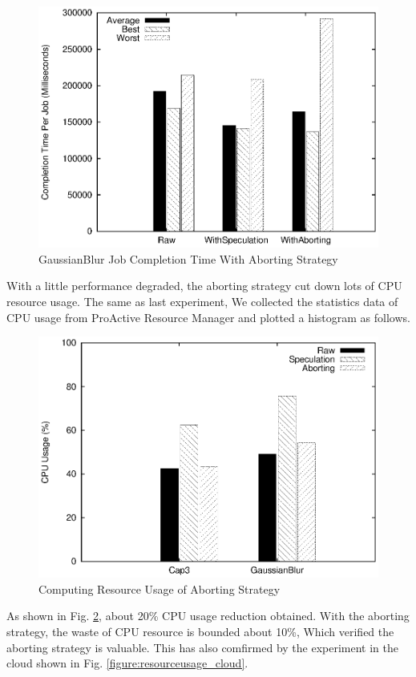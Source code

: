 \begin{figure}
\centering
\includegraphics[width=0.9\columnwidth]{figures/abort_completiontime_gaussianblur.eps}
\caption{GaussianBlur Job Completion Time With Aborting Strategy}
\label{figure:abort_completiontime_gaussianblur}
\end{figure}

With a little performance degraded, the aborting strategy cut down lots of CPU resource usage. The same as last experiment, We collected the statistics data of CPU usage from ProActive Resource Manager and plotted a histogram as follows.

\begin{figure}
\centering
\includegraphics[width=0.9\columnwidth]{figures/abort_resource_usage.eps}
\caption{Computing Resource Usage of Aborting Strategy}
\label{figure:abort_resourceusage}
\end{figure}

As shown in Fig. \ref{figure:abort_resourceusage}, about 20\% CPU usage reduction obtained. With the aborting strategy, the waste of CPU resource is bounded about 10\%, Which verified the aborting strategy is valuable. This has also comfirmed by the experiment in the cloud shown in Fig. \ref{figure:resourceusage_cloud}.
